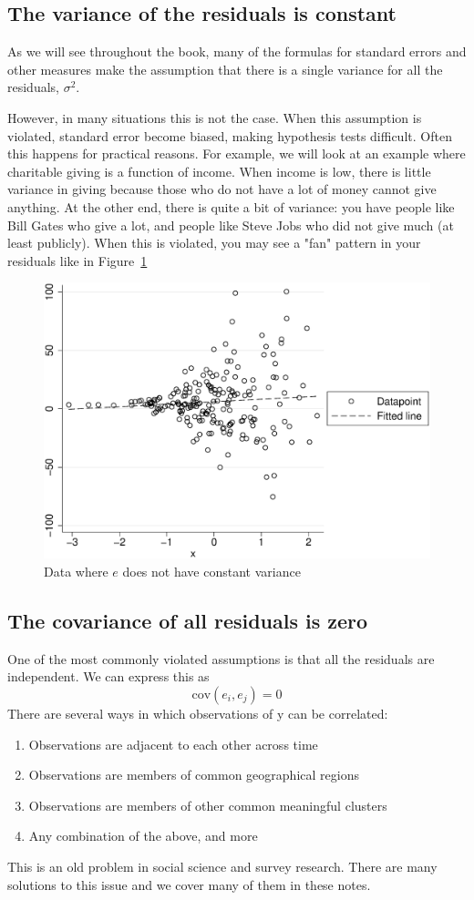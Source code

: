 \subsection{The variance of the residuals is constant}
As we will see throughout the book, many of the formulas for standard errors and other measures make the assumption that there is a single variance for all the residuals, $\sigma^2$.

However, in many situations this is not the case. When this assumption is violated, standard error become biased, making hypothesis tests difficult. Often this happens for practical reasons. For example, we will look at an example where charitable giving is a function of income. When income is low, there is little variance in giving because those who do not have a lot of money cannot give anything. At the other end, there is quite a bit of variance: you have people like Bill Gates who give a lot, and people like Steve Jobs who did not give much (at least publicly). When this is violated, you may see a "fan" pattern in your residuals like in Figure~\ref{fig:hetero}
\begin{figure}
   \centering
   \includegraphics[angle=0,
           width=.75\textwidth]{hetero.eps}
   \caption{Data where $e$ does not have constant variance}
  \label{fig:hetero}
\end{figure}
\subsection{The covariance of all residuals is zero}
One of the most commonly violated assumptions is that all the residuals are independent. We can express this as
\begin{equation}
\mbox{cov}\left(e_i,e_j\right)=0
\end{equation}
There are several ways in which observations of y can be correlated:
\begin{enumerate}
 \item Observations are adjacent to each other across time
 \item Observations are members of common geographical regions
 \item Observations are members of other common meaningful clusters
 \item Any combination of the above, and more
\end{enumerate}
This is an old problem in social science and survey research. There are many solutions to this issue and we cover many of them in these notes.
